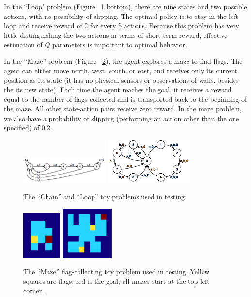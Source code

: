 \documentclass[10pt, twocolumn, twoside]{article}
\begin{document}
In the ``Loop" problem (Figure ~\ref{fig:chainloop} bottom), there are nine states and
two possible actions, with no possibility of slipping. The optimal policy is to stay
in the left loop and receive reward of 2 for every 5 actions. Because this problem has
very little distinguishing the two actions in terms of short-term reward, effective
estimation of $Q$ parameters is important to optimal behavior.

In the ``Maze'' problem (Figure ~\ref{fig:maze}), the agent explores a maze to find
flags. The agent can either move north, west, south, or east, and receives only its
current position as its state (it has no physical sensors or observations of walls,
besides the its new state). Each time the agent reaches the goal, it receives a reward
equal to the number of flags collected and is transported back to the beginning of the
maze. All other state-action pairs receive zero reward. In the maze problem, we also
have a probability of slipping (performing an action other than the one specified) of 0.2.

\begin{figure}[!htb]
\centering
\includegraphics[width=0.4\textwidth]{chain.png}
\includegraphics[width=0.4\textwidth]{loop.png}
\caption{\label{fig:chainloop} The ``Chain'' and ``Loop'' toy problems used in testing.}
\end{figure}

\begin{figure}[!htb]
\centering
\includegraphics[width=0.18\textwidth]{easymaze.png}
\includegraphics[width=0.24\textwidth]{hardmaze.png}
\caption{\label{fig:maze} The ``Maze'' flag-collecting toy problem used in testing.
Yellow squares are flags; red is the goal; all mazes start at the top left corner.}
\end{figure}
\end{document}
